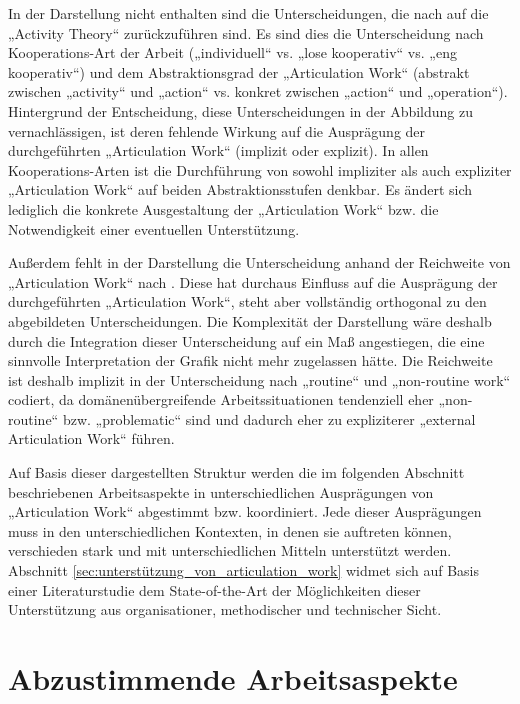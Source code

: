 In der Darstellung nicht enthalten sind die Unterscheidungen, die nach \citep{Fjuk97} auf die „Activity Theory“ zurückzuführen sind. Es sind dies die Unterscheidung nach Kooperations-Art der Arbeit („individuell“ vs. „lose kooperativ“ vs. „eng kooperativ“) und dem Abstraktionsgrad der „Articulation Work“ (abstrakt zwischen „activity“ und „action“ vs. konkret zwischen „action“ und „operation“). Hintergrund der Entscheidung, diese Unterscheidungen in der Abbildung zu vernachlässigen, ist deren fehlende Wirkung auf die Ausprägung der durchgeführten „Articulation Work“ (implizit oder explizit). In allen Kooperations-Arten ist die Durchführung von sowohl impliziter als auch expliziter „Articulation Work“ auf beiden Abstraktionsstufen denkbar. Es ändert sich lediglich die konkrete Ausgestaltung der „Articulation Work“ bzw. die Notwendigkeit einer eventuellen Unterstützung.

Außerdem fehlt in der Darstellung die Unterscheidung anhand der Reichweite von „Articulation Work“ nach \citep{Faergemann05}. Diese hat durchaus Einfluss auf die Ausprägung der durchgeführten „Articulation Work“, steht aber vollständig orthogonal zu den abgebildeten Unterscheidungen. Die Komplexität der Darstellung wäre deshalb durch die Integration dieser Unterscheidung auf ein Maß angestiegen, die eine sinnvolle Interpretation der Grafik nicht mehr zugelassen hätte. Die Reichweite ist deshalb implizit in der Unterscheidung nach „routine“ und „non-routine work“ codiert, da domänenübergreifende Arbeitssituationen tendenziell eher „non-routine“ bzw. „problematic“ sind und dadurch eher zu expliziterer „external Articulation Work“ führen.

Auf Basis dieser dargestellten Struktur werden die im folgenden Abschnitt beschriebenen Arbeitsaspekte in unterschiedlichen Ausprägungen von „Articulation Work“ abgestimmt bzw. koordiniert. Jede dieser Ausprägungen muss in den unterschiedlichen Kontexten, in denen sie auftreten können, verschieden stark und mit unterschiedlichen Mitteln unterstützt werden. Abschnitt \ref{sec:unterstützung_von_articulation_work} widmet sich auf Basis einer Literaturstudie dem State-of-the-Art der Möglichkeiten dieser Unterstützung aus organisationer, methodischer und technischer Sicht.


\section{Abzustimmende Arbeitsaspekte} %
\label{sec:abzustimmende_arbeitsaspekte}

